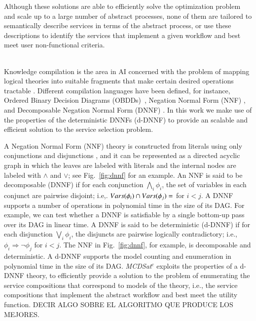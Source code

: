 \documentclass{article}
\begin{document}
{\begin{description}
Although these solutions are able to efficiently solve the optimization problem and scale up to a large number of abstract processes, none of them are tailored to semantically describe services in terms of the abstract process, or use these descriptions to identify the services that  implement a given workflow and best meet user non-functional criteria.

  
\item[Knowledge Compilation Languages] \mbox{}\\
Knowledge compilation is the area in AI concerned with the
problem of mapping logical theories into suitable fragments
that make certain desired operations tractable
\cite{cadoli:compilation}. Different compilation languages have been defined, for instance,  
Ordered Binary Decision Diagrams (OBDDs)~\cite{bryant:obdd},  Negation Normal Form (NNF) \cite{barwise:handbook}, and Decomposable Negation Normal Form (DNNF)  \cite{darwiche:dnnf}.
In this work we make use of the properties of the deterministic DNNFs  (d-DNNF) \cite{darwiche:d-dnnfs} to provide an scalable and efficient solution to the service selection problem. 

A Negation Normal Form (NNF) theory is  constructed from literals using only conjunctions
and disjunctions \cite{barwise:handbook}, and it can be represented as a directed acyclic graph
in which the leaves are labeled with literals and the
internal nodes are labeled with $\land$ and $\lor$;
see Fig.~\ref{fig:dnnf} for an example. An NNF is said to be decomposable (DNNF) \cite{darwiche:dnnf}
if for each conjunction $\bigwedge_i\phi_i$, the set of
variables in each conjunct are pairwise disjoint;
i.e,. $Vars(\phi_i)\cap Vars(\phi_j)=\empty$ for $i<j$.
A DNNF supports a number of operations in
polynomial time in the size of its DAG. For example,
we can test whether a DNNF is satisfiable by a single
bottom-up pass over its DAG in linear time. A DNNF is said to be deterministic (d-DNNF) \cite{darwiche:d-dnnfs} if for each disjunction $\bigvee_i\phi_i$, the disjuncts
are pairwise logically contradictory; i.e.,
$\phi_i\Rightarrow\neg\phi_j$ for $i<j$.
The NNF in Fig.~\ref{fig:dnnf}, for example, is decomposable
and deterministic. A d-DNNF supports the model counting and enumeration in polynomial time
in the size of its DAG.  {\it MCDSat}$^c$  exploits the properties of a d-DNNF theory, to efficiently provide a solution to the problem of enumerating the service compositions that correspond to models of the  theory, i.e., the service compositions that implement the abstract  workflow and best meet the utility function. DECIR ALGO SOBRE EL ALGORITMO QUE PRODUCE LOS MEJORES.




\end{description}}
\end{document}
